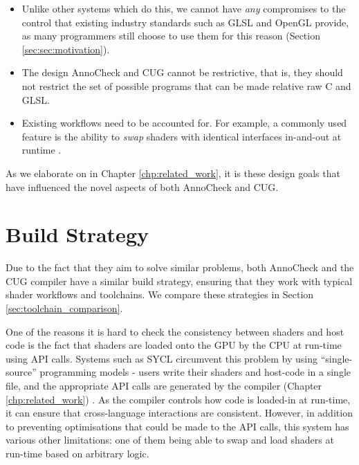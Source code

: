 \documentclass[a4paper,12pt,twoside,openright]{report}
\begin{document}
\begin{itemize}

    \item Unlike other systems which do this, we cannot have \textit{any}
    compromises to the control that existing industry standards such as GLSL
    and OpenGL provide, as many programmers still choose to use them for this
    reason (Section \ref{sec:sec:motivation}).

    \item The design AnnoCheck and CUG cannot be restrictive, that is, they
    should not restrict the set of possible programs that can be made relative
    raw C and GLSL.

    \item Existing workflows need to be accounted for. For example, a commonly
    used feature is the ability to \textit{swap} shaders with identical
    interfaces in-and-out at runtime \cite{TODO}.

\end{itemize}

As we elaborate on in Chapter \ref{chp:related_work}, it is these design goals
that have influenced the novel aspects of both AnnoCheck and CUG.

\section{Build Strategy}

Due to the fact that they aim to solve similar problems, both AnnoCheck and the
CUG compiler have a similar build strategy, ensuring that they work with
typical shader workflows and toolchains. We compare these strategies in Section
\ref{sec:toolchain_comparison}.

One of the reasons it is hard to check the consistency between shaders and host
code is the fact that shaders are loaded onto the GPU by the CPU at run-time
using API calls. Systems such as SYCL circumvent this problem by using
``single-source'' programming models - users write their shaders and host-code
in a single file, and the appropriate API calls are generated by the compiler
(Chapter \ref{chp:related_work}) \cite{TODO}. As the compiler controls how code
is loaded-in at run-time, it can ensure that cross-language interactions are
consistent. However, in addition to preventing optimisations that could be made
to the API calls, this system has various other limitations: one of them being
able to swap and load shaders at run-time based on arbitrary logic.
\end{document}
